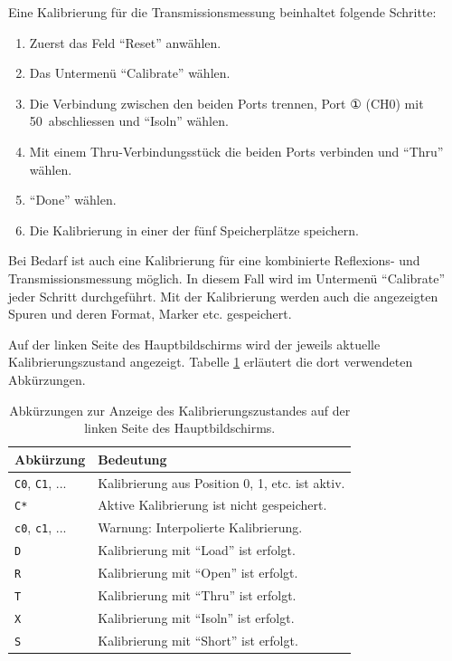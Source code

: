 \documentclass[twoside,a4paper,11pt,halfparskip,DIV=11,notitlepage]{scrartcl}
\begin{document}
Eine Kalibrierung für die Transmissionsmessung beinhaltet folgende Schritte:

\begin{enumerate}
    \item Zuerst das Feld ``Reset'' anwählen.
    \item Das Untermenü ``Calibrate'' wählen.
    \item Die Verbindung zwischen den beiden Ports trennen, Port ①  (CH0) mit 50~\Ohm abschliessen und ``Isoln'' wählen.
    \item Mit einem Thru-Verbindungsstück die beiden Ports verbinden und ``Thru'' wählen.
    \item ``Done'' wählen.
    \item Die Kalibrierung in einer der fünf Speicherplätze speichern.
\end{enumerate}

Bei Bedarf ist auch eine Kalibrierung für eine kombinierte Reflexions- und Transmissionsmessung
möglich. In diesem Fall wird im Untermenü ``Calibrate'' jeder Schritt durchgeführt. Mit der
Kalibrierung werden auch die angezeigten Spuren und deren Format, Marker etc. gespeichert.

Auf der linken Seite des Hauptbildschirms wird der jeweils aktuelle Kalibrierungszustand
angezeigt. Tabelle \ref{tab:calibration} erläutert die dort verwendeten Abkürzungen.

\begin{table}
    \begin{center}
        \caption{Abkürzungen zur Anzeige des Kalibrierungszustandes auf der linken Seite des
        Hauptbildschirms.}
        \label{tab:calibration}
        \begin{tabular}{ll}\toprule
            \textbf{Abkürzung} & \textbf{Bedeutung}\\\midrule
            \texttt{C0}, \texttt{C1}, ... & Kalibrierung aus Position 0, 1, etc. ist aktiv.\\
            \texttt{C*} & Aktive Kalibrierung ist nicht gespeichert.\\
            \texttt{c0}, \texttt{c1}, ... & Warnung: Interpolierte Kalibrierung.\\
            \texttt{D} & Kalibrierung mit ``Load'' ist erfolgt.\\
            \texttt{R} & Kalibrierung mit ``Open'' ist erfolgt.\\
            \texttt{T} & Kalibrierung mit ``Thru'' ist erfolgt.\\
            \texttt{X} & Kalibrierung mit ``Isoln'' ist erfolgt.\\
            \texttt{S} & Kalibrierung mit ``Short'' ist erfolgt.\\
            \bottomrule
        \end{tabular}
    \end{center}
\end{table}
\end{document}
